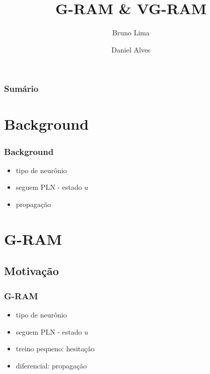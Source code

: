 \documentclass{beamer}
\title{G-RAM \& VG-RAM}
\author{Bruno Lima \and Daniel Alves}
\date{}
\begin{document}
\titlepage

\begin{frame}
    \frametitle{Sumário}
    \tableofcontents
\end{frame}
\section{Background}
\begin{frame}
    \frametitle{Background}
    \begin{itemize}
        \item tipo de neurônio
        \item seguem PLN - estado $u$
        \item propagação
    \end{itemize}
\end{frame}
\section{G-RAM}
\subsection{Motivação}
\begin{frame}
    \frametitle{G-RAM}
    \begin{itemize}
        \item tipo de neurônio
        \item seguem PLN - estado $u$
        \item treino pequeno: hesitação
        \item diferencial: propagação
    \end{itemize}
\end{frame}
\end{document}
